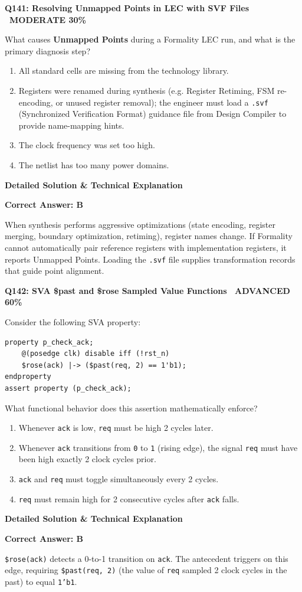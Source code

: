 \documentclass[11pt,a4paper]{article}
\newcommand{\badgeadv}{{\color{white}\colorbox{advred}{\bfseries\sffamily\tiny\ ADVANCED 60\%\ }}}
\newcommand{\badgemod}{{\color{white}\colorbox{modoran}{\bfseries\sffamily\tiny\ MODERATE 30\%\ }}}
\newenvironment{qbox}[2]{%
  \begin{mdframed}[style=qstyle]%
  {\bfseries\sffamily\color{primaryblue}#1 \hfill #2}\par\vspace{2pt}%
}{%
  \end{mdframed}%
}
\newenvironment{ansbox}{%
  \begin{mdframed}[style=ansstyle]%
  {\bfseries\sffamily\color{ansgreen}\small Detailed Solution \& Technical Explanation}\par\vspace{2pt}\small%
}{%
  \end{mdframed}%
}
\begin{document}
\begin{qbox}{Q141: Resolving Unmapped Points in LEC with SVF Files}{\badgemod}
What causes \textbf{Unmapped Points} during a Formality LEC run, and what is the primary diagnosis step?
\begin{enumerate}[label=\textbf{\Alph*.}]
  \item All standard cells are missing from the technology library.
  \item Registers were renamed during synthesis (e.g. Register Retiming, FSM re-encoding, or unused register removal); the engineer must load a \texttt{.svf} (Synchronized Verification Format) guidance file from Design Compiler to provide name-mapping hints.
  \item The clock frequency was set too high.
  \item The netlist has too many power domains.
\end{enumerate}
\end{qbox}
\begin{ansbox}
\textbf{Correct Answer: B}

When synthesis performs aggressive optimizations (state encoding, register merging, boundary optimization, retiming), register names change. If Formality cannot automatically pair reference registers with implementation registers, it reports Unmapped Points. Loading the \texttt{.svf} file supplies transformation records that guide point alignment.
\end{ansbox}

\begin{qbox}{Q142: SVA \$past and \$rose Sampled Value Functions}{\badgeadv}
Consider the following SVA property:
\begin{lstlisting}[style=verilogstyle]
property p_check_ack;
    @(posedge clk) disable iff (!rst_n)
    $rose(ack) |-> ($past(req, 2) == 1'b1);
endproperty
assert property (p_check_ack);
\end{lstlisting}
What functional behavior does this assertion mathematically enforce?
\begin{enumerate}[label=\textbf{\Alph*.}]
  \item Whenever \texttt{ack} is low, \texttt{req} must be high 2 cycles later.
  \item Whenever \texttt{ack} transitions from \texttt{0} to \texttt{1} (rising edge), the signal \texttt{req} must have been high exactly 2 clock cycles prior.
  \item \texttt{ack} and \texttt{req} must toggle simultaneously every 2 cycles.
  \item \texttt{req} must remain high for 2 consecutive cycles after \texttt{ack} falls.
\end{enumerate}
\end{qbox}
\begin{ansbox}
\textbf{Correct Answer: B}

\texttt{\$rose(ack)} detects a 0-to-1 transition on \texttt{ack}. The antecedent triggers on this edge, requiring \texttt{\$past(req, 2)} (the value of \texttt{req} sampled 2 clock cycles in the past) to equal \texttt{1'b1}.
\end{ansbox}
\end{document}
